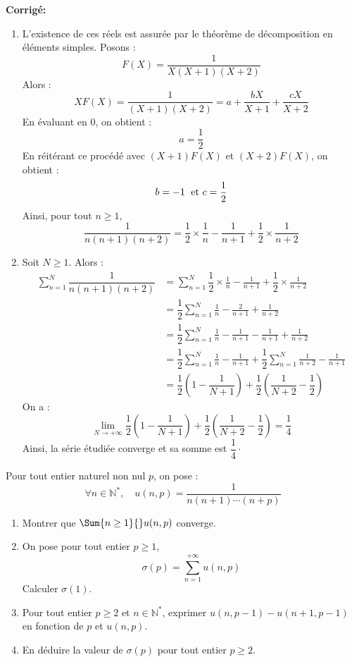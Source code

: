 \documentclass[a4paper,twoside,french,10pt]{VcCours}
\newcommand{\corr}{\textbf{Corrigé:}}
\begin{document}
\corr 
\begin{enumerate}
\item L'existence de ces réels est assurée par le théorème de décomposition en éléments simples. Posons :
$$ F(X) = \dfrac{1}{X(X+1)(X+2)}$$
Alors :
$$ XF(X) = \dfrac{1}{(X+1)(X+2)} = a + \dfrac{bX}{X+1} + \dfrac{cX}{X+2}$$
En évaluant en $0$, on obtient :
$$ a = \dfrac{1}{2}$$
En réitérant ce procédé avec $(X+1)F(X)$ et $(X+2)F(X)$, on obtient :
$$ b = -1 \; \hbox{ et } c = \dfrac{1}{2}$$
Ainsi, pour tout $n \geq 1$,
$$  \frac{1}{n(n+1)(n+2)} = \dfrac{1}{2} \times \frac{1}{n} - \frac{1}{n+1}  +\dfrac{1}{2} \times \frac{1}{n+2}$$
\item Soit $N \geq 1$. Alors :
\begin{align*}
\sum_{n=1}^N \dfrac{1}{n(n+1)(n+2)} & = \sum_{n=1}^N  \dfrac{1}{2} \times \frac{1}{n} - \frac{1}{n+1} + \dfrac{1}{2} \times \frac{1}{n+2} \\
& = \dfrac{1}{2} \sum_{n=1}^N  \frac{1}{n} - \frac{2}{n+1}  +\frac{1}{n+2} \\
& = \dfrac{1}{2} \sum_{n=1}^N  \frac{1}{n} - \frac{1}{n+1} - \frac{1}{n+1}  + \frac{1}{n+2} \\
& =  \dfrac{1}{2} \sum_{n=1}^N  \frac{1}{n} - \frac{1}{n+1} +  \dfrac{1}{2} \sum_{n=1}^N   \frac{1}{n+2} - \frac{1}{n+1}  \\
& = \dfrac{1}{2} \left(1 - \dfrac{1}{N+1} \right) + \dfrac{1}{2} \left( \dfrac{1}{N+2} - \dfrac{1}{2} \right)
\end{align*}
On a :
$$ \lim_{N \rightarrow + \infty} \dfrac{1}{2} \left(1 - \dfrac{1}{N+1} \right) + \dfrac{1}{2} \left( \dfrac{1}{N+2} - \dfrac{1}{2} \right) = \dfrac{1}{4}$$
Ainsi, la série étudiée converge et sa somme est $\dfrac{1}{4} \cdot$
\end{enumerate}

\medskip


\begin{Exercice}{} Pour tout entier naturel non nul $p$, on pose :
$$ \forall n \in \mathbb{N}^*, \quad u(n,p) = \frac{1}{n(n+1)\cdots(n+p)}$$

\begin{enumerate}
\item Montrer que $\Sum{n \geq 1}{}  u(n,p)$ converge.
\item On pose pour tout entier $p \geq 1$,
$$ \sigma(p) = \sum_{n=1}^{+ \infty} u(n,p)$$
Calculer $\sigma(1)$.
\item Pour tout entier $p \geq 2$ et $n \in \mathbb{N}^*$, exprimer $u(n,p-1)-u(n+1,p-1)$ en fonction de $p$ et $u(n,p)$.
\item En déduire la valeur de $\sigma(p)$ pour tout entier $p \geq 2$.
\end{enumerate}
\end{Exercice}
\end{document}
